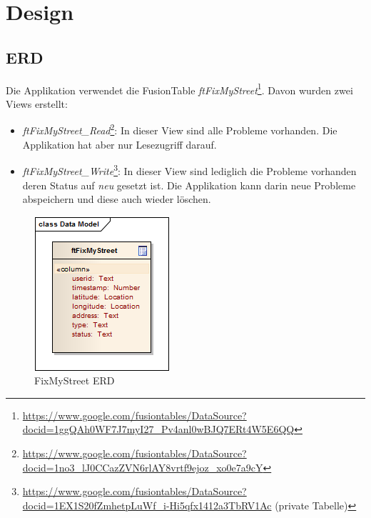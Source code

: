 \begin{figure}[H]
\end{figure}

\section{Design}

\subsection{ERD}
Die Applikation verwendet die FusionTable \emph{ftFixMyStreet}\footnote{\url{https://www.google.com/fusiontables/DataSource?docid=1ggQAh0WF7J7myI27_Pv4anl0wBJQ7ERt4W5E6QQ}}. Davon wurden zwei Views erstellt:

\begin{itemize}
\item \emph{ftFixMyStreet\_Read}\footnote{\url{https://www.google.com/fusiontables/DataSource?docid=1no3_lJ0CCazZVN6rlAY8vrtf9ejoz_xo0e7a9cY}}: In dieser View sind alle Probleme vorhanden. Die Applikation hat aber nur Lesezugriff darauf.
\item \emph{ftFixMyStreet\_Write}\footnote{\url{https://www.google.com/fusiontables/DataSource?docid=1EX1S20fZmhetpLuWf_i-Hi5qfx1412a3TbRV1Ac} (private Tabelle)}: In dieser View sind lediglich die Probleme vorhanden deren Status auf \emph{neu} gesetzt ist. Die Applikation kann darin neue Probleme abspeichern und diese auch wieder löschen.
\end{itemize}

\begin{figure}[H]
	\centering
	\includegraphics{images/usecase2-fixmystreet/uml/fixmystreet-erd.png}
	\caption{FixMyStreet ERD}
	\label{fixmystreet-erd}
\end{figure}

